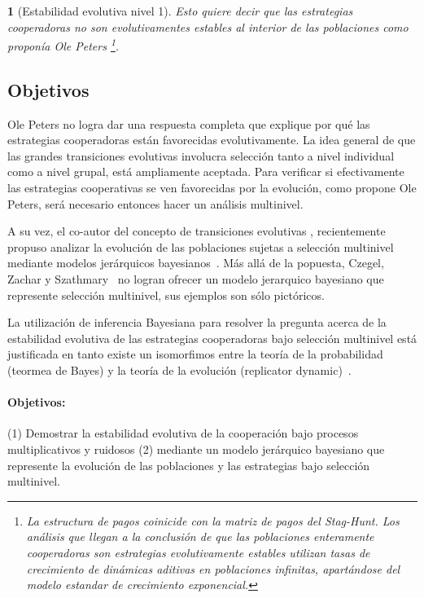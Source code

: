 \documentclass[a4paper,10pt]{article}
\newif\ifen
\newif\ifes
\newcommand{\en}[1]{\ifen#1\fi}
\newcommand{\es}[1]{\ifes#1\fi}
\newtheorem{conclution}{\en{Conclution}\es{Conclusión}}%
\begin{document}
\begin{conclution}[Estabilidad evolutiva nivel 1]
Esto quiere decir que las estrategias cooperadoras no son evolutivamentes estables al interior de las poblaciones como proponía Ole Peters \footnote{La estructura de pagos coinicide con la matriz de pagos del Stag-Hunt. Los análisis que llegan a la conclusión de que las poblaciones enteramente cooperadoras son estrategias evolutivamente estables utilizan tasas de crecimiento de dinámicas aditivas en poblaciones infinitas, apartándose del modelo estandar de crecimiento exponencial.}.
\end{conclution}

\subsection{Objetivos}

Ole Peters no logra dar una respuesta completa que explique por qué las estrategias cooperadoras están favorecidas evolutivamente.
La idea general de que las grandes transiciones evolutivas involucra selección tanto a nivel individual como a nivel grupal, está ampliamente aceptada.
Para verificar si efectivamente las estrategias cooperativas se ven favorecidas por la evolución, como propone Ole Peters, será necesario entonces hacer un análisis multinivel.

A su vez, el co-autor del concepto de transiciones evolutivas \cite{szathmary1995-evolutionaryTransitions, szathmary2015-evolutionaryTransitions}, recientemente propuso analizar la evolución de las poblaciones sujetas a selección multinivel mediante modelos jerárquicos bayesianos~\cite{czegel2019-bayesianEvolution}.
Más allá de la popuesta, Czegel, Zachar y Szathmary~\cite{czegel2019-bayesianEvolution} no logran ofrecer un modelo jerarquico bayesiano que represente selección multinivel, sus ejemplos son sólo pictóricos.

La utilización de inferencia Bayesiana para resolver la pregunta acerca de la estabilidad evolutiva de las estrategias cooperadoras bajo selección multinivel está justificada en tanto existe un isomorfimos entre la teoría de la probabilidad (teormea de Bayes) y la teoría de la evolución (replicator dynamic)~\cite{harper2009-replicatorAsInference,shalizi2009-replicatorAsInference}.

\paragraph{Objetivos:}
(1) Demostrar la estabilidad evolutiva de la cooperación bajo procesos multiplicativos y ruidosos (2) mediante un modelo jerárquico bayesiano que represente la evolución de las poblaciones y las estrategias bajo selección multinivel.
\end{document}

